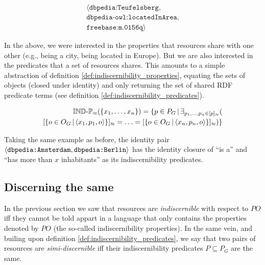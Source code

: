 \small
\begin{example}[Triple 2]
\label{ex:triple2}
\begin{align}
\langle
  \texttt{dbpedia:Teufelsberg},\\
  \texttt{dbpedia-owl:locatedInArea},\nonumber\\
  \texttt{freebase:m.0156q}
\rangle\nonumber
\end{align}
\end{example}
\normalsize

\noindent In the above, we were interested in the properties
  that resources share with one other
  (e.g., being a city, being located in Europe).
But we are also interested in the predicates that a set of resources shares.
This amounts to a simple abstraction of
  definition \ref{def:indiscernibility_properties},
  equating the sets of objects (closed under identity)
  and only returning the set of shared RDF predicate terms
  (see definition \ref{def:indiscernibility_predicates}).

\small
\begin{definition}
\label{def:indiscernibility_predicates}
\begin{align}
  \indp_{\approx}(\setrange{x_1}{x_n})
=
  \setdef{
    p \in P_G
  }{
    \exists_{\range{p_1}{p_n} \in \equivset{p}}(\nonumber\\
        \equivset{
          \setdef{
            o \in O_G
          }{
            \triple{x_1}{p_1}{o}
          }
        }
      =
        \ldots
      =
        \equivset{
          \setdef{
            o \in O_G
          }{
            \triple{x_n}{p_n}{o}
          }
        }
    )
  }\nonumber
\end{align}
\end{definition}
\normalsize

\noindent Taking the same example as before, the identity pair
  {\small $\langle\texttt{dbpedia:Amsterdam},\texttt{dbpedia:Berlin}\rangle$}
  has the identity closure of
  ``is a'' and ``has more than $x$ inhabitants''
  as its indiscernibility predicates.



\subsection{Discerning the same}

In the previous section we saw that resources are \mbox{\emph{indiscernible}}
  with respect to $PO$ iff they cannot be told appart
  in a language that only contains the properties denoted by $PO$
  (the so-called indiscernibility properties).
In the same vein,
  and builing upon definition \ref{def:indiscernibility_predicates},
  we say that two pairs of resources are \emph{simi-discernible}
  iff their \mbox{indiscernibility} predicates $P \subseteq P_G$ are the same.

